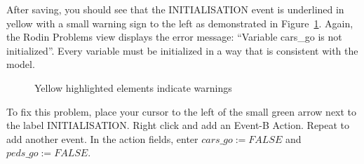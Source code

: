 

After saving, you should see that the \textsf{INITIALISATION} event is underlined in yellow with a small warning sign to the left as demonstrated in Figure~\ref{fig_tut_03_warning}. Again, the \textsf{Rodin Problems} view displays the error message: ``Variable cars\_go is not initialized''. Every variable must be initialized in a way that is consistent with the model.

\begin{figure}[!ht]
\begin{center}
	\caption{Yellow highlighted elements indicate warnings}
	\label{fig_tut_03_warning}
\end{center}
\end{figure}

To fix this problem, place your cursor to the left of the small green arrow next to the label \textsf{INITIALISATION}. Right click and add an \textsf{Event-B Action}. Repeat to add another event. In the action fields, enter $cars\_go :=  FALSE$ and $peds\_go :=  FALSE$.



